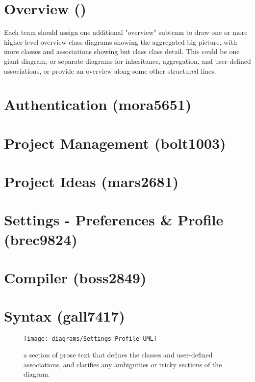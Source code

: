 \documentclass[11pt]{report}
\begin{document}
\section{Overview ()}
Each team should assign one additional "overview" subteam to draw one or more higher-level overview class diagrams showing the aggregated big picture, with more classes and associations showing but class class detail. This could be one giant diagram, or separate diagrams for inheritance, aggregation, and user-defined associations, or provide an overview along some other structured lines.



\section{Authentication (mora5651)}



\section{Project Management (bolt1003)}



\section{Project Ideas (mars2681)}



\section{Settings - Preferences \& Profile (brec9824)}



\section{Compiler (boss2849)}



\section{Syntax (gall7417)}
    \begin{wrapfigure}{r}{0.9\textwidth}
        \begin{center}
            \texttt{[image: diagrams/Settings\_Profile\_UML]}
        \end{center}
        \caption{a section of prose text that defines the classes and user-defined associations, and clarifies any ambiguities or tricky sections of the diagram.}
    \end{wrapfigure}
\end{document}
